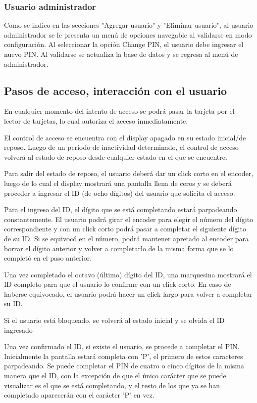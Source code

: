 \documentclass[10pt,a4paper]{article}
\begin{document}
\subsubsection{Usuario administrador}
Como se indico en las secciones "Agregar usuario" y "Eliminar usuario", al usuario administrador se le presenta un menú de opciones navegable al validarse en modo configuración. Al seleccionar la opción Change PIN, el usuario debe ingresar el nuevo PIN. Al validarse se actualiza la base de datos y se regresa al menú de administrador. 

\subsection{Pasos de acceso, interacción con el usuario}
En cualquier momento del intento de acceso se podrá pasar la tarjeta por el lector de tarjetas, lo cual autoriza el acceso inmediatamente.\par
El control de acceso se encuentra con el display apagado en su estado inicial/de reposo. Luego de un período de inactividad determinado, el control de acceso volverá al estado de reposo desde cualquier estado en el que se encuentre.\par
Para salir del estado de reposo, el usuario deberá dar un click corto en el encoder, luego de lo cual el display mostrará una pantalla llena de ceros y se deberá proceder a ingresar el ID (de ocho dígitos) del usuario que solicita el acceso. \par
Para el ingreso del ID, el dígito que se está completando estará parpadeando constantemente. El usuario podrá girar el encoder para elegir el número del dígito correspondiente y con un click corto podrá pasar a completar el siguiente dígito de su ID. Si se equivocó en el número, podrá mantener apretado al encoder para borrar el dígito anterior y volver a completarlo de la misma forma que se lo completó en el paso anterior. \par
Una vez completado el octavo (último) dígito del ID, una marquesina mostrará el ID completo para que el usuario lo confirme con un click corto. En caso de haberse equivocado, el usuario podrá hacer un click largo para volver a completar su ID.\par
Si el usuario está bloqueado, se volverá al estado inicial y se olvida el ID ingresado\par
Una vez confirmado el ID, si existe el usuario, se procede a completar el PIN. Inicialmente la pantalla estará completa con 'P', el primero de estos caracteres parpadeando. Se puede completar el PIN de cuatro o cinco dígitos de la misma manera que el ID, con la excepción de que el único carácter que se puede visualizar es el que se está completando, y el resto de los que ya se han completado aparecerán con el carácter 'P' en vez. \par
\end{document}
